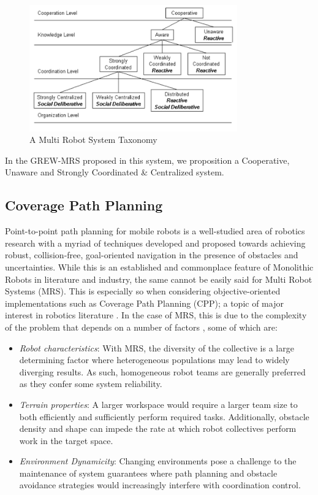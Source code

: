 \documentclass{report}
\begin{document}
\begin{figure}[h]
	\centering
	\includegraphics[width=0.8\textwidth]{images/MRS_taxonomy.png}
	\caption{A Multi Robot System Taxonomy \cite{Iocchi2001}}
	\label{fig:MRS_taxonomy}
\end{figure}

In the GREW-MRS proposed in this system, we proposition a Cooperative, Unaware and Strongly Coordinated \& Centralized system.

\newpage

\subsection{Coverage Path Planning}
Point-to-point path planning for mobile robots is a well-studied area of robotics research with a myriad of techniques developed and proposed towards achieving robust, collision-free, goal-oriented navigation in the presence of obstacles and uncertainties. While this is an established and commonplace feature of Monolithic Robots in literature and industry, the same cannot be easily said for Multi Robot Systems (MRS). This is especially so when considering objective-oriented implementations such as Coverage Path Planning (CPP); a topic of major interest in robotics literature \cite{Macas2009}. In the case of MRS, this is due to the complexity of the problem that depends on a number of factors \cite{Yan2014}, some of which are:
\begin{itemize}
 \item \textit{Robot characteristics}: With MRS, the diversity of the collective is a large determining factor where heterogeneous populations may lead to widely diverging results. As such, homogeneous robot teams are generally preferred as they confer some system reliability.
 \item \textit{Terrain properties}: A larger workspace would require a larger team size to both efficiently and sufficiently perform required tasks. Additionally, obstacle density and shape can impede the rate at which robot collectives perform work in the target space.
 \item \textit{Environment Dynamicity}: Changing environments pose a challenge to the maintenance of system guarantees where path planning and obstacle avoidance strategies would increasingly interfere with coordination control.
\end{itemize}
\end{document}
